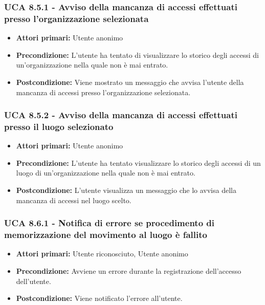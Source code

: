 \subsubsection{UCA 8.5.1 - Avviso della mancanza di accessi effettuati presso l'organizzazione selezionata}
\begin{itemize}
    \item \textbf{Attori primari:} Utente anonimo
    \item \textbf{Precondizione:} L'utente ha tentato di visualizzare lo storico degli accessi di un'organizzazione nella quale non è mai entrato.
    \item \textbf{Postcondizione:} Viene mostrato un messaggio che avvisa l'utente della mancanza di accessi presso l'organizzazione selezionata.
\end{itemize}

\subsubsection{UCA 8.5.2 - Avviso della mancanza di accessi effettuati presso il luogo selezionato}
\begin{itemize}
    \item \textbf{Attori primari:} Utente anonimo
    \item \textbf{Precondizione:} L'utente ha tentato visualizzare lo storico degli accessi di un luogo di un'organizzazione nella quale non è mai entrato.
    \item \textbf{Postcondizione:} L'utente visualizza un messaggio che lo avvisa della mancanza di accessi nel luogo scelto.
\end{itemize}

\subsubsection{UCA 8.6.1 - Notifica di errore se procedimento di memorizzazione del movimento al luogo è fallito}
\begin{itemize}
	\item \textbf{Attori primari:} Utente riconosciuto, Utente anonimo
	\item \textbf{Precondizione:} Avviene un errore durante la registrazione dell'accesso dell'utente.
	\item \textbf{Postcondizione:} Viene notificato l'errore all'utente.
\end{itemize}
